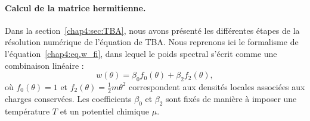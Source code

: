 %
%
%







\paragraph{Calcul de la matrice hermitienne.}

Dans la section~\ref{chap4:sec:TBA}, nous avons présenté les différentes étapes de la résolution numérique de l’équation de \gls*{TBA}.  
Nous reprenons ici le formalisme de l’équation~\eqref{chap4:eq.w_fi}, dans lequel le poids spectral s’écrit comme une combinaison linéaire :  
\begin{equation}\label{chap4:eq.w.1}
	w(\theta) = \beta_0 f_0(\theta) + \beta_2 f_2(\theta),
\end{equation}
où $f_0(\theta) = 1$ et $f_2(\theta) = \tfrac{1}{2} m \theta^2$ correspondent aux densités locales associées aux charges conservées.  
Les coefficients $\beta_0$ et $\beta_2$ sont fixés de manière à imposer une température $T$ et un potentiel chimique $\mu$.  

